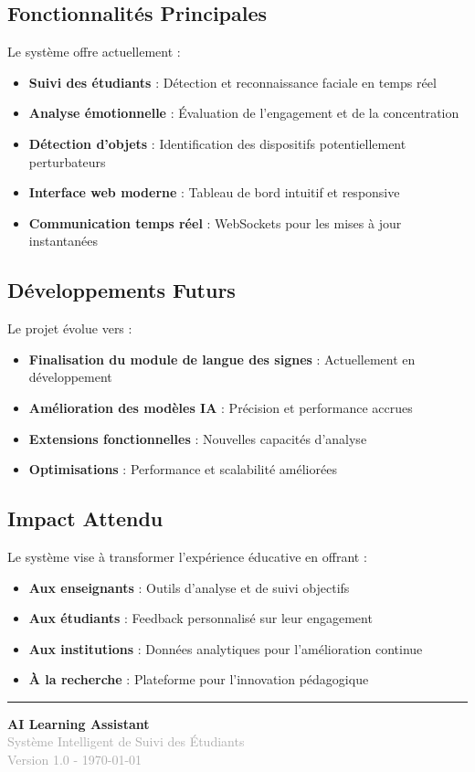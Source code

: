 \documentclass[12pt,a4paper]{article}
\begin{document}
\subsection{Fonctionnalités Principales}

Le système offre actuellement :

\begin{itemize}
    \item \textbf{Suivi des étudiants} : Détection et reconnaissance faciale en temps réel
    \item \textbf{Analyse émotionnelle} : Évaluation de l'engagement et de la concentration
    \item \textbf{Détection d'objets} : Identification des dispositifs potentiellement perturbateurs
    \item \textbf{Interface web moderne} : Tableau de bord intuitif et responsive
    \item \textbf{Communication temps réel} : WebSockets pour les mises à jour instantanées
\end{itemize}

\subsection{Développements Futurs}

Le projet évolue vers :

\begin{itemize}
    \item \textbf{Finalisation du module de langue des signes} : Actuellement en développement
    \item \textbf{Amélioration des modèles IA} : Précision et performance accrues
    \item \textbf{Extensions fonctionnelles} : Nouvelles capacités d'analyse
    \item \textbf{Optimisations} : Performance et scalabilité améliorées
\end{itemize}

\subsection{Impact Attendu}

Le système vise à transformer l'expérience éducative en offrant :

\begin{itemize}
    \item \textbf{Aux enseignants} : Outils d'analyse et de suivi objectifs
    \item \textbf{Aux étudiants} : Feedback personnalisé sur leur engagement
    \item \textbf{Aux institutions} : Données analytiques pour l'amélioration continue
    \item \textbf{À la recherche} : Plateforme pour l'innovation pédagogique
\end{itemize}

\vspace{2cm}

\hrule

\vspace{0.5cm}

\begin{center}
\textbf{\large AI Learning Assistant}\\
\textcolor{darkgray}{Système Intelligent de Suivi des Étudiants}\\
\textcolor{darkgray}{\small Version 1.0 - \today}
\end{center}
\end{document}
